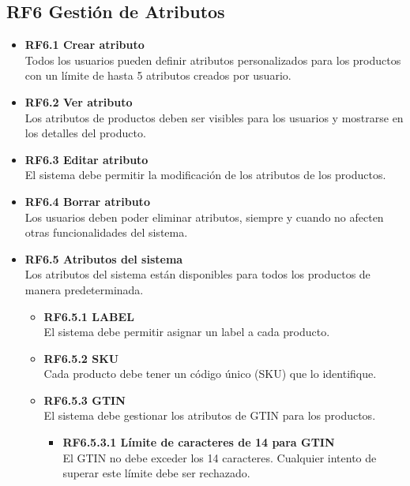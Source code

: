 \documentclass[12pt.a4paper]{article}
\begin{document}
\subsection*{RF6 Gestión de Atributos}

\begin{itemize}
    \item \textbf{RF6.1 Crear atributo} \\
    Todos los usuarios pueden definir atributos personalizados para los productos con un límite de hasta 5 atributos creados por usuario.

    \item \textbf{RF6.2 Ver atributo} \\
    Los atributos de productos deben ser visibles para los usuarios y mostrarse en los detalles del producto.

    \item \textbf{RF6.3 Editar atributo} \\
    El sistema debe permitir la modificación de los atributos de los productos.

    \item \textbf{RF6.4 Borrar atributo} \\
    Los usuarios deben poder eliminar atributos, siempre y cuando no afecten otras funcionalidades del sistema.

    \item \textbf{RF6.5 Atributos del sistema} \\
    Los atributos del sistema están disponibles para todos los productos de manera predeterminada.
    \begin{itemize}
        \item \textbf{RF6.5.1 LABEL} \\
        El sistema debe permitir asignar un label a cada producto.

        \item \textbf{RF6.5.2 SKU} \\
        Cada producto debe tener un código único (SKU) que lo identifique.

        \item \textbf{RF6.5.3 GTIN} \\
        El sistema debe gestionar los atributos de GTIN para los productos.
        \begin{itemize}
            \item \textbf{RF6.5.3.1 Límite de caracteres de 14 para GTIN} \\
            El GTIN no debe exceder los 14 caracteres. Cualquier intento de superar este límite debe ser rechazado.


\end{itemize}
\end{itemize}
\end{itemize}
\end{document}

